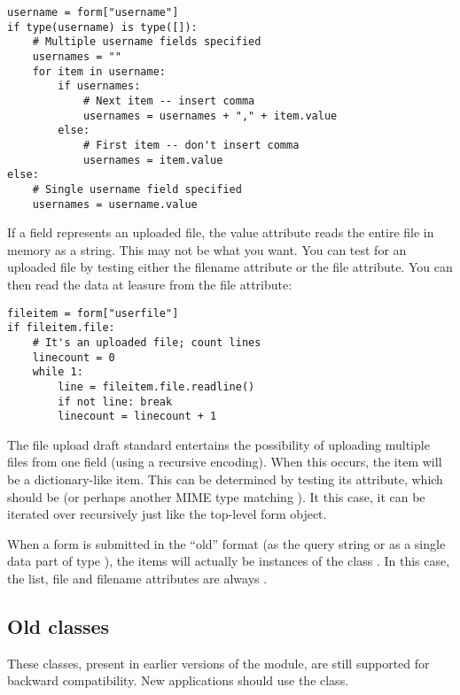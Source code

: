 \begin{verbatim}
username = form["username"]
if type(username) is type([]):
    # Multiple username fields specified
    usernames = ""
    for item in username:
        if usernames:
            # Next item -- insert comma
            usernames = usernames + "," + item.value
        else:
            # First item -- don't insert comma
            usernames = item.value
else:
    # Single username field specified
    usernames = username.value
\end{verbatim}

If a field represents an uploaded file, the value attribute reads the
entire file in memory as a string.  This may not be what you want.
You can test for an uploaded file by testing either the filename
attribute or the file attribute.  You can then read the data at
leasure from the file attribute:

\begin{verbatim}
fileitem = form["userfile"]
if fileitem.file:
    # It's an uploaded file; count lines
    linecount = 0
    while 1:
        line = fileitem.file.readline()
        if not line: break
        linecount = linecount + 1
\end{verbatim}

The file upload draft standard entertains the possibility of uploading
multiple files from one field (using a recursive
 encoding).  When this occurs, the item will be
a dictionary-like  item.  This can be determined
by testing its  attribute, which should be
 (or perhaps another MIME type matching
).  It this case, it can be iterated over
recursively just like the top-level form object.

When a form is submitted in the ``old'' format (as the query string or
as a single data part of type
), the items will actually
be instances of the class .  In this case, the
list, file and filename attributes are always .


\subsection{Old classes}

These classes, present in earlier versions of the  module,
are still supported for backward compatibility.  New applications
should use the  class.

